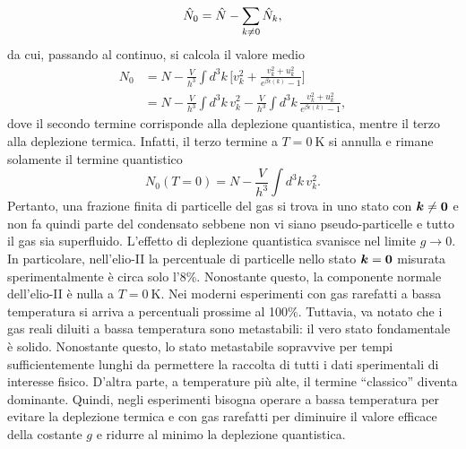 \begin{equation}
    \hat{N}_0 = \hat{N} - \sum_{k \neq 0}\hat{N}_k,
\end{equation}
da cui, passando al continuo, si calcola il valore medio
\begin{equation}
    \begin{split}
        N_0 &= N - \frac{V}{h^3}\int d^3k\,\bigg[v^2_k + \frac{v^2_k + u^2_k}{e^{\beta\epsilon(k)} - 1}\bigg] \\
        &= N - \frac{V}{h^3}\int d^3k\,v^2_k - \frac{V}{h^3}\int d^3k\,\frac{v^2_k + u^2_k}{e^{\beta\epsilon(k)} - 1},
    \end{split} 
\end{equation}
dove il secondo termine corrisponde alla deplezione quantistica, mentre il terzo alla deplezione termica. Infatti, il terzo termine a $T = \SI{0}{\kelvin}$ si annulla e rimane solamente il termine quantistico
\begin{equation}
    N_0(T = 0) = N - \frac{V}{h^3}\int d^3k\,v^2_k.
\end{equation}
Pertanto, una frazione finita di particelle del gas si trova in uno stato con $\bm{k} \neq \bm{0}$ e non fa quindi parte del condensato sebbene non vi siano pseudo-particelle e tutto il gas sia superfluido. L'effetto di deplezione quantistica svanisce nel limite $g \to 0$. In particolare, nell'elio-II la percentuale di particelle nello stato $\bm{k} = \bm{0}$ misurata sperimentalmente è circa solo l'8\%. Nonostante questo, la componente normale dell'elio-II è nulla a $T = \SI{0}{\kelvin}$. Nei moderni esperimenti con gas rarefatti a bassa temperatura si arriva a percentuali prossime al 100\%. Tuttavia, va notato che i gas reali diluiti a bassa temperatura sono metastabili: il vero stato fondamentale è solido. Nonostante questo, lo stato metastabile sopravvive per tempi sufficientemente lunghi da permettere la raccolta di tutti i dati sperimentali di interesse fisico. D'altra parte, a temperature più alte, il termine ``classico'' diventa dominante. Quindi, negli esperimenti bisogna operare a bassa temperatura per evitare la deplezione termica e con gas rarefatti per diminuire il valore efficace della costante $g$ e ridurre al minimo la deplezione quantistica. 
